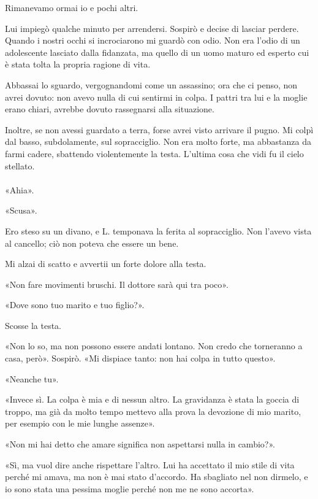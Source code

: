 \documentclass[a4paper,12pt]{book}
\begin{document}
Rimanevamo ormai io e pochi altri.

Lui impiegò qualche minuto per arrendersi. Sospirò e decise di lasciar perdere.
Quando i nostri occhi si incrociarono mi guardò con odio. Non era l'odio di un
adolescente lasciato dalla fidanzata, ma quello di un uomo maturo ed esperto cui
è stata tolta la propria ragione di vita.

Abbassai lo sguardo, vergognandomi come un assassino; ora che ci penso, non
avrei dovuto: non avevo nulla di cui sentirmi in colpa. I pattri tra lui e la
moglie erano chiari, avrebbe dovuto rassegnarsi alla situazione.

Inoltre, se non avessi guardato a terra, forse avrei visto arrivare il pugno.
Mi colpì dal basso, subdolamente, sul sopracciglio. Non era molto forte, ma
abbastanza da farmi cadere, sbattendo violentemente la testa. L'ultima cosa che
vidi fu il cielo stellato.

\paragraph{}
«Ahia».

«Scusa».

Ero steso su un divano, e L. temponava la ferita al sopracciglio. Non l'avevo
vista al cancello; ciò non poteva che essere un bene.

Mi alzai di scatto e avvertii un forte dolore alla testa.

«Non fare movimenti bruschi. Il dottore sarà qui tra poco».

«Dove sono tuo marito e tuo figlio?».

Scosse la testa.

«Non lo so, ma non possono essere andati lontano. Non credo che torneranno a
casa, però». Sospirò. «Mi dispiace tanto: non hai colpa in tutto questo».

«Neanche tu».

«Invece sì. La colpa è mia e di nessun altro. La gravidanza è stata la goccia di
troppo, ma già da molto tempo mettevo alla prova la devozione di mio marito, per
esempio con le mie lunghe assenze».

«Non mi hai detto che amare significa non aspettarsi nulla in cambio?».

«Sì, ma vuol dire anche rispettare l'altro. Lui ha accettato il mio stile di
vita perché mi amava, ma non è mai stato d'accordo. Ha sbagliato nel non
dirmelo, e io sono stata una pessima moglie perché non me ne sono accorta».
\end{document}
